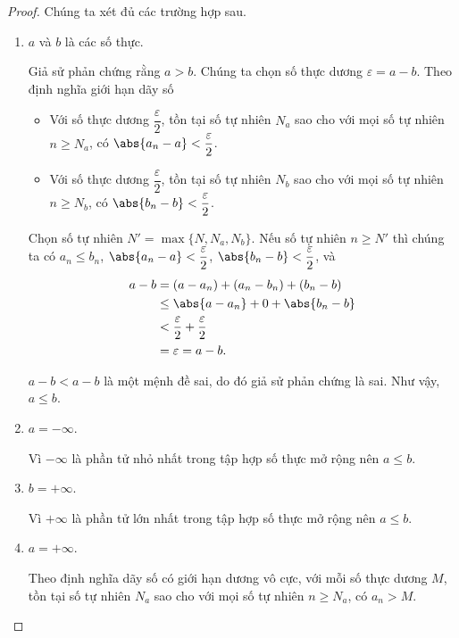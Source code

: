 \begin{proof}
    Chúng ta xét đủ các trường hợp sau.
    \begin{enumerate}[label={\textbf{Trường hợp \arabic*.}},itemindent=1.6cm]
        \item $a$ và $b$ là các số thực.

              Giả sử phản chứng rằng $a > b$. Chúng ta chọn số thực dương $\varepsilon = a - b$. Theo định nghĩa giới hạn dãy số
              \begin{itemize}
                  \item Với số thực dương $\dfrac{\varepsilon}{2}$, tồn tại số tự nhiên $N_{a}$ sao cho với mọi số tự nhiên $n\geq N_{a}$, có $\abs{a_{n} - a} < \dfrac{\varepsilon}{2}$.
                  \item Với số thực dương $\dfrac{\varepsilon}{2}$, tồn tại số tự nhiên $N_{b}$ sao cho với mọi số tự nhiên $n\geq N_{b}$, có $\abs{b_{n} - b} < \dfrac{\varepsilon}{2}$.
              \end{itemize}

              Chọn số tự nhiên $N' = \max\{ N, N_{a}, N_{b} \}$. Nếu số tự nhiên $n\geq N'$ thì chúng ta có $a_{n}\leq b_{n}$, $\abs{a_{n} - a} < \dfrac{\varepsilon}{2}$, $\abs{b_{n} - b} < \dfrac{\varepsilon}{2}$, và
              \begin{align*}
                  a - b & = (a - a_{n}) + (a_{n} - b_{n}) + (b_{n} - b)   \\
                        & \leq \abs{a - a_{n}} + 0 + \abs{b_{n} - b}      \\
                        & < \frac{\varepsilon}{2} + \frac{\varepsilon}{2} \\
                        & = \varepsilon = a - b.
              \end{align*}

              $a - b < a - b$ là một mệnh đề sai, do đó giả sử phản chứng là sai. Như vậy, $a\leq b$.
        \item $a = -\infty$.

              Vì $-\infty$ là phần tử nhỏ nhất trong tập hợp số thực mở rộng nên $a\leq b$.
        \item $b = +\infty$.

              Vì $+\infty$ là phần tử lớn nhất trong tập hợp số thực mở rộng nên $a\leq b$.
        \item $a = +\infty$.

              Theo định nghĩa dãy số có giới hạn dương vô cực, với mỗi số thực dương $M$, tồn tại số tự nhiên $N_{a}$ sao cho với mọi số tự nhiên $n\geq N_{a}$, có $a_{n} > M$.


\end{enumerate}
\end{proof}
